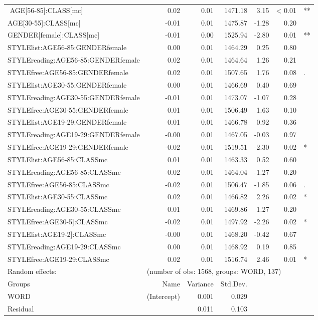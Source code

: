 {\begin{longtable}[c]{p{}rrrrrl}
$$		AGE[56-85]:CLASS[mc] & 0.02 & 0.01 & 1471.18 & 3.15 & < 0.01 & ** \\ 
		AGE[30-55]:CLASS[mc] & -0.01 & 0.01 & 1475.87 & -1.28 & 0.20 & \\ 
		GENDER[female]:CLASS[mc] & -0.01 & 0.00 & 1525.94 & -2.80 & 0.01 & **\\ 
		STYLElist:AGE56-85:GENDERfemale & 0.00 & 0.01 & 1464.29 & 0.25 & 0.80 & \\ 
		STYLEreading:AGE56-85:GENDERfemale & 0.02 & 0.01 & 1464.64 & 1.26 & 0.21 & \\ 
		STYLEfree:AGE56-85:GENDERfemale & 0.02 & 0.01 & 1507.65 & 1.76 & 0.08 & .\\ 
		STYLElist:AGE30-55:GENDERfemale & 0.00 & 0.01 & 1466.69 & 0.40 & 0.69 & \\ 
		STYLEreading:AGE30-55:GENDERfemale & -0.01 & 0.01 & 1473.07 & -1.07 & 0.28 & \\ 
		STYLEfree:AGE30-55:GENDERfemale & 0.01 & 0.01 & 1506.49 & 1.63 & 0.10 & \\ 
		STYLElist:AGE19-29:GENDERfemale & 0.01 & 0.01 & 1466.78 & 0.92 & 0.36 & \\ 
		STYLEreading:AGE19-29:GENDERfemale & -0.00 & 0.01 & 1467.05 & -0.03 & 0.97 & \\ 
		STYLEfree:AGE19-29:GENDERfemale & -0.02 & 0.01 & 1519.51 & -2.30 & 0.02 & *\\ 
		STYLElist:AGE56-85:CLASSmc & 0.01 & 0.01 & 1463.33 & 0.52 & 0.60 & \\ 
		STYLEreading:AGE56-85:CLASSmc & -0.02 & 0.01 & 1464.04 & -1.27 & 0.20 & \\ 
		STYLEfree:AGE56-85:CLASSmc & -0.02 & 0.01 & 1506.47 & -1.85 & 0.06 & .\\ 
		STYLElist:AGE30-55:CLASSmc & 0.02 & 0.01 & 1466.82 & 2.26 & 0.02 & * \\ 
		STYLEreading:AGE30-55:CLASSmc & 0.01 & 0.01 & 1469.86 & 1.27 & 0.20 & \\ 
		STYLEfree:AGE30-5]:CLASSmc & -0.02 & 0.01 & 1497.92 & -2.26 & 0.02 & * \\ 
		STYLElist:AGE19-2]:CLASSmc & -0.00 & 0.01 & 1468.20 & -0.42 & 0.67 & \\ 
		STYLEreading:AGE19-29:CLASSmc & 0.00 & 0.01 & 1468.92 & 0.19 & 0.85 & \\ 
		STYLEfree:AGE19-29:CLASSmc & 0.02 & 0.01 & 1516.74 & 2.46 & 0.01 & * \\ 
		\hline
		Random effects: & \multicolumn{6}{l}{(number of obs: 1568, groups: WORD, 137)} \\
		Groups &         Name & Variance &      Std.Dev. & & & \\
		WORD &  (Intercept) & 0.001 & 0.029 & & & \\
		Residual  &         & 0.011 & 0.103 & & & \\
		\hline
	\end{longtable}
}

